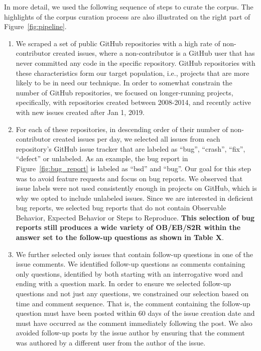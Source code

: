 In more detail, we used the following sequence of steps to curate the corpus. The highlights of the corpus curation process are also illustrated on the right part of Figure~\ref{fig:pipeline}.
\begin{enumerate}
\item We scraped a set of public GitHub repositories with a high rate of
non-contributor created issues, where a non-contributor is a GitHub user that has never
committed any code in the specific repository. GitHub repositories with these characteristics form
our target population, i.e., projects that are more likely to be in need our technique. In order
to somewhat constrain the number of GitHub repositories, we focused on longer-running projects,
specifically, with repositories created between 2008-2014, and recently active with new issues created after Jan 1, 2019.
\item For each of these repositories, in descending order of their number of non-contributor created issues per day,
we selected all issues from each repository's GitHub issue tracker that are labeled as ``bug'', ``crash'', ``fix'', ``defect'' or unlabeled. As an example, the bug report in Figure~\ref{fig:bug_report} is labeled as ``bsd'' and ``bug''.
Our goal for this step was to avoid feature requests and focus on bug reports. We observed that issue labels were not used consistently enough
in projects on GitHub, which is why we opted to include unlabeled issues. Since we are interested in deficient bug reports, we selected bug reports that do not contain Observable Behavior, Expected Behavior or Steps to Reproduce. {\bf This selection of bug reports still produces a wide variety of OB/EB/S2R within the answer set to the follow-up questions as shown in Table X}.
\item We further selected only issues that contain follow-up questions in one of the issue comments.  We identified follow-up questions as  comments containing only questions, identified by both starting with an interrogative word and ending with a question mark. In order to ensure we selected follow-up questions and not just
any questions, we constrained our selection based on time and comment sequence. That is, the comment containing the follow-up question must have been posted within 60 days of the issue creation date and must have occurred as the comment immediately following the post. We also avoided follow-up posts by the issue author by ensuring that the comment was authored by a different user from the author of the issue.

\end{enumerate}
